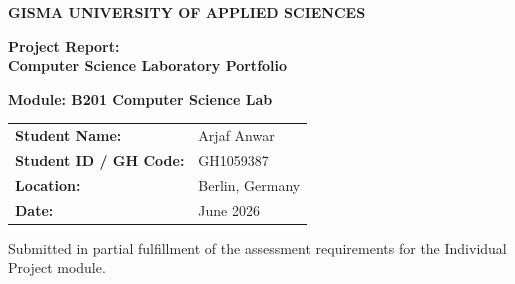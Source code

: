 \documentclass[12pt,a4paper]{article}
\begin{document}
\begin{titlepage}
    \centering
    \vspace*{2.5cm}
    
    {\Large\bfseries GISMA UNIVERSITY OF APPLIED SCIENCES \par}
    
    \vspace{3cm}
    
    {\huge\bfseries Project Report: \\ Computer Science Laboratory Portfolio \par}
    
    \vspace{1.5cm}
    
    {\Large\bfseries Module: B201 Computer Science Lab \par}
    
    \vspace{3.5cm}
    
    \begin{center}
        \Large
        \begin{tabular}{ll}
            \textbf{Student Name:} & Arjaf Anwar \\[0.3cm]
            \textbf{Student ID / GH Code:} & GH1059387 \\[0.3cm]
            \textbf{Location:} & Berlin, Germany \\[0.3cm]
            \textbf{Date:} & June 2026 \\
        \end{tabular}
    \end{center}
    
    \vfill
    
    {\small Submitted in partial fulfillment of the assessment requirements for the Individual Project module. \par}
\end{titlepage}

\newpage
\tableofcontents
\newpage

\end{document}

